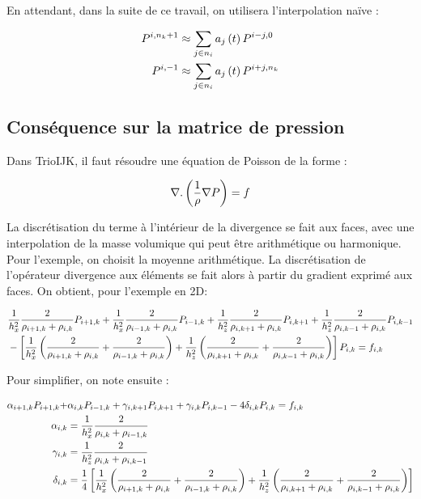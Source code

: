 En attendant, dans la suite de ce travail, on utilisera l'interpolation naïve :

\begin{align}
P^{i,n_k+1}&\approx \sum_{j\in n_{i}} a_j\left( t\right)P^{i-j,0}\label{interpole_pression1}\\
P^{i,-1}&\approx \sum_{j\in n_{i}} a_j\left( t\right)P^{i+j,n_k}\label{interpole_pression2}
\end{align}
  

\subsection{Conséquence sur la matrice de pression}

Dans TrioIJK, il faut résoudre une équation de Poisson de la forme :

\begin{align}
\nabla.\left( \frac{1}{\rho}\nabla P\right) = f
\end{align}

La discrétisation du terme à l'intérieur de la divergence se fait aux faces, avec une interpolation de la masse volumique qui peut être arithmétique ou harmonique. Pour l'exemple, on choisit la moyenne arithmétique. La discrétisation de l'opérateur divergence aux éléments se fait alors à partir du gradient exprimé aux faces. On obtient, pour l'exemple en 2D: 

\begin{align}
&\frac{1}{h_x^2}\frac{2}{\rho_{i+1,k}+\rho_{i,k}}P_{i+1,k}+\frac{1}{h_x^2}\frac{2}{\rho_{i-1,k}+\rho_{i,k}}P_{i-1,k}+\frac{1}{h_z^2}\frac{2}{\rho_{i,k+1}+\rho_{i,k}}P_{i,k+1}+\frac{1}{h_z^2}\frac{2}{\rho_{i,k-1}+\rho_{i,k}}P_{i,k-1}\\
&-\left[ \frac{1}{h_x^2}\left( \frac{2}{\rho_{i+1,k}+\rho_{i,k}}+\frac{2}{\rho_{i-1,k}+\rho_{i,k}}\right)+\frac{1}{h_z^2}\left( \frac{2}{\rho_{i,k+1}+\rho_{i,k}}+\frac{2}{\rho_{i,k-1}+\rho_{i,k}}\right)\right]P_{i,k}= f_{i,k}\nonumber
\end{align}

Pour simplifier, on note ensuite :

\begin{align}
\alpha_{i+1,k}P_{i+1,k}+&\alpha_{i,k}P_{i-1,k}+\gamma_{i,k+1}P_{i,k+1}+\gamma_{i,k}P_{i,k-1}-4\delta_{i,k}P_{i,k}= f_{i,k}\\
\alpha_{i,k}&=\frac{1}{h_x^2}\frac{2}{\rho_{i,k}+\rho_{i-1,k}}\\
\gamma_{i,k}&=\frac{1}{h_z^2}\frac{2}{\rho_{i,k}+\rho_{i,k-1}}\\
\delta_{i,k}&=\frac{1}{4}\left[ \frac{1}{h_x^2}\left( \frac{2}{\rho_{i+1,k}+\rho_{i,k}}+\frac{2}{\rho_{i-1,k}+\rho_{i,k}}\right)+\frac{1}{h_z^2}\left( \frac{2}{\rho_{i,k+1}+\rho_{i,k}}+\frac{2}{\rho_{i,k-1}+\rho_{i,k}}\right)\right]
\end{align}

